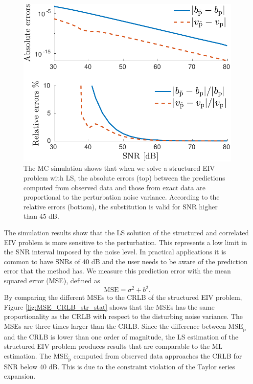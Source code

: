 \begin{figure}[htb!]
  \centering
  \includegraphics[width=0.69\columnwidth]{./ChapterStatisticalAnalysis/fig/Fig_10.pdf} 
  \caption{ \label{fig:bv_btvt_abse_rele_str_e7} The MC simulation shows that when we solve a structured EIV problem with LS, the absolute errors (top) between the predictions computed from observed data and those from exact data are proportional to the perturbation noise variance. According to the relative errors (bottom), the substitution is valid for SNR higher than 45 dB. } 
\end{figure}

The simulation results show that the LS solution of the structured and correlated EIV problem is more sensitive to the perturbation.
This represents a low limit in the SNR interval imposed by the noise level.
In practical applications it is common to have SNRs of 40 dB and the user needs to be aware of the prediction error that the method has.
We measure this prediction error with the mean squared error (MSE), defined as
\begin{equation} \mathrm{MSE} = \sigma^2 + b^2. \end{equation}
 By comparing the different MSEs to the CRLB of the structured EIV problem,
Figure \ref{fig:MSE_CRLB_str_stat} shows that the MSEs has the same proportionality as the CRLB with respect to the disturbing noise variance.
The MSEs are three times larger than the CRLB.
Since the difference between $\mathrm{MSE}_{\widetilde{\mathrm{p}}}$ and the CRLB is lower than one order of magnitude, 
the LS estimation of the structured EIV problem produces results that are comparable to the ML estimation.
The $\mathrm{MSE}_{\widetilde{\mathrm{p}}}$ computed from observed data approaches the CRLB for SNR below 40 dB.
This is due to the constraint violation of the Taylor series expansion.



